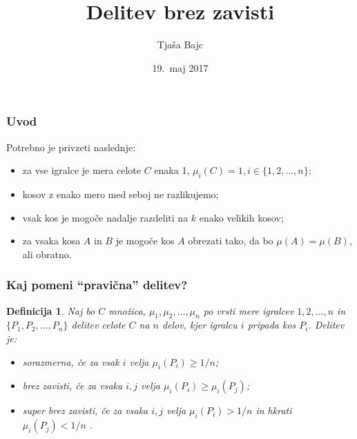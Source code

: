 \documentclass{beamer}
\title{Delitev brez zavisti}
\author{Tjaša Bajc}
\date{19.\ maj 2017}
\newtheorem{definicija}{Definicija}
\begin{document}

\begin{frame}
\titlepage
\end{frame}


\begin{frame}
\frametitle{Uvod}

Potrebno je privzeti naslednje:

\begin{itemize}
\item za vse igralce je mera celote $C$ enaka 1, $\mu_i(C) = 1, i \in \{1, 2, \ldots, n\}$;
\item kosov z enako mero med seboj ne razlikujemo; 
\item vsak kos je mogoče nadalje razdeliti na $k$ enako velikih kosov;
\item za vsaka kosa $A$ in $B$ je mogoče kos $A$ obrezati tako, da bo $\mu(A) = \mu(B)$, ali obratno.							
\end{itemize}

\end{frame}


\begin{frame}
\frametitle{Kaj pomeni ``pravična'' delitev?}

\begin{definicija}
Naj bo $C$ množica, $\mu_1, \mu_2, \ldots, \mu_n$ po vrsti mere igralcev $1, 2, \ldots, n$ in $\{P_1, P_2, \ldots, P_n\}$ delitev celote $C$ na $n$ delov, kjer igralcu $i$ pripada kos $P_i$. Delitev je:

\begin{itemize}
\item {\em sorazmerna\/}, če za vsak $i$ velja $\mu_i(P_i) \geq 1/n$;
\item {\em brez zavisti\/}, če za vsaka $i, j$ velja $\mu_i(P_i) \geq \mu_i(P_j)$;
\item{\em super brez zavisti\/}, če za vsaka $i, j$ velja $\mu_i(P_i) > 1/n$ in hkrati $\mu_i(P_j) < 1/n$ .								
\end{itemize}

\end{definicija}

\end{frame}

\end{document}
